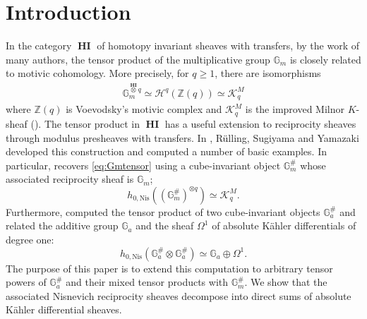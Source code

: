 \documentclass[a4paper,12pt,reqno]{amsart}
\numberwithin{equation}{section}
\theoremstyle{definition}
\newcommand{\Z}{\mathbb{Z}}
\newcommand{\Gm}{\mathbb{G}_{m}}
\newcommand{\Ga}{\mathbb{G}_{a}}
\newcommand{\blue}{\color{blue}}
\newcommand{\black}{\color{black}}
\newcommand{\HI}{\operatorname{\mathbf{HI}}}
\newcommand{\GaSharp}{\mathbb{G}_{a}^{\#}}
\newcommand{\GmSharp}{\mathbb G_m^{\#}}
\newcommand{\Nis}{\mathrm{Nis}}
\begin{document}
\section{Introduction}\label{sec:intro}
In the category $\HI$ of homotopy invariant sheaves with transfers, by the work of many authors, 
the tensor product of the multiplicative group $\Gm$ 
is closely related to motivic cohomology. 
More precisely,
for $q\geq1$, there are isomorphisms
\begin{align}\label{eq:Gmtensor}
    \Gm^{\overset{\HI}{\otimes}q}\simeq \mathcal{H}^q(\Z(q))\simeq \mathcal{K}_q^M
\end{align}
where $\Z(q)$ is Voevodsky's motivic complex and $\mathcal{K}^M_q$ is the improved Milnor $K$-sheaf (\cite{Ker10}).
The tensor product in $\HI$ %
has a useful
extension to reciprocity sheaves through modulus presheaves with transfers.
In \cite[Sections~4--5]{RSY22}, R\"ulling, Sugiyama and Yamazaki developed this construction and computed a number of basic examples. 
In particular,
\cite[Proposition~5.6]{RSY22} recovers \eqref{eq:Gmtensor} using a cube-invariant object $\GmSharp$ whose associated reciprocity sheaf is $\Gm$;
\[
h_{0,\Nis}\left((\GmSharp)^{\otimes q}
 \right)
 \simeq
 \mathcal{K}^M_q.
\]
Furthermore, \cite[Theorem~5.14 and Theorem~5.15]{RSY22} computed the tensor product of two cube-invariant objects 
$\GaSharp$ and 
related 
the additive group $\Ga$ and the sheaf $\Omega^1$ of absolute K\"ahler differentials of degree one: 
\[
 h_{0,\Nis}(\GaSharp\otimes\GaSharp)
 \simeq \Ga\oplus\Omega^1.
\]
The purpose of this paper is to extend this computation to arbitrary
tensor powers of $\GaSharp$ and their mixed tensor products with $\GmSharp$. 
We show that the associated Nisnevich
reciprocity sheaves decompose into direct sums of
absolute K\"ahler differential sheaves.
\end{document}
